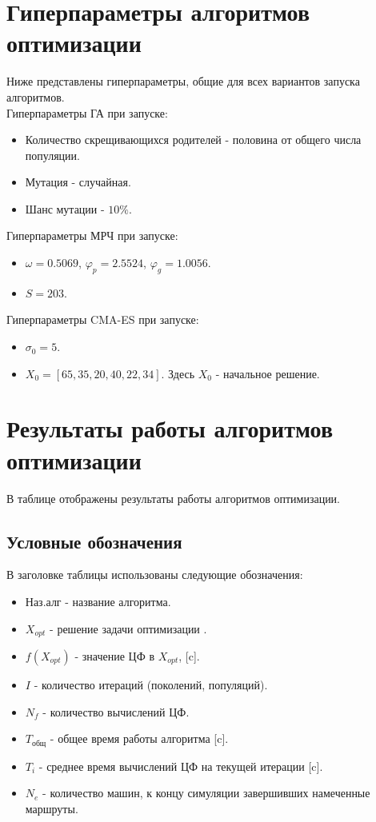 \section{Гиперпараметры алгоритмов оптимизации}
Ниже представлены гиперпараметры, общие для всех вариантов запуска алгоритмов.\\
Гиперпараметры ГА при запуске:
\begin{itemize}
	\item Количество скрещивающихся родителей - половина от общего числа популяции.
	\item Мутация - случайная.
	\item Шанс мутации - $10\%$.
\end{itemize}
Гиперпараметры МРЧ при запуске:
\begin{itemize}
	\item $\omega = 0.5069$, $\varphi_p = 2.5524$, $\varphi_g = 1.0056$.
	\item $S = 203$.
\end{itemize}
Гиперпараметры CMA-ES при запуске:
\begin{itemize}
	\item $\sigma_0 = 5$.
	\item $X_0 = [65, 35, 20, 40, 22, 34]$. Здесь $X_0$ - начальное решение.
\end{itemize}

\section{Результаты работы алгоритмов оптимизации}
В таблице  отображены результаты работы алгоритмов оптимизации.\\
\subsection{Условные обозначения}
В заголовке таблицы использованы следующие обозначения:
\begin{itemize}
	\item Наз.алг - название алгоритма.
	\item $X_{opt}$ - решение задачи оптимизации .
	\item  $f(X_{opt})$ - значение ЦФ в $X_{opt}$, [c].
	\item $I$ - количество итераций (поколений, популяций).
	\item $N_{f}$ - количество вычислений ЦФ.
	\item $T_{\text{общ}}$ - общее время работы алгоритма [c].
	\item $T_{i}$ - среднее время вычислений ЦФ на текущей итерации [c].
	\item $N_{e}$ - количество машин, к концу симуляции завершивших намеченные маршруты.
\end{itemize}

